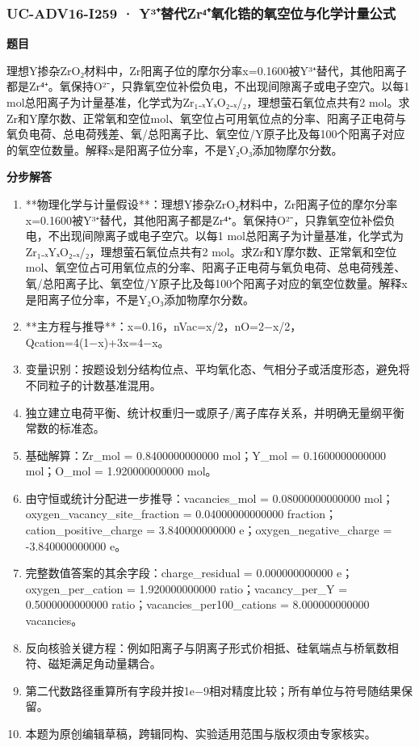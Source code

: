 \documentclass[UTF8,11pt,a4paper]{ctexart}
\begin{document}
\subsubsection*{UC-ADV16-I259 · Y³⁺替代Zr⁴⁺氧化锆的氧空位与化学计量公式}
\noindent\textbf{题目}\par
理想Y掺杂ZrO₂材料中，Zr阳离子位的摩尔分率x=0.1600被Y³⁺替代，其他阳离子都是Zr⁴⁺。氧保持O²⁻，只靠氧空位补偿负电，不出现间隙离子或电子空穴。以每1 mol总阳离子为计量基准，化学式为Zr₁₋ₓYₓO₂₋ₓ/₂，理想萤石氧位点共有2 mol。求Zr和Y摩尔数、正常氧和空位mol、氧空位占可用氧位点的分率、阳离子正电荷与氧负电荷、总电荷残差、氧/总阳离子比、氧空位/Y原子比及每100个阳离子对应的氧空位数量。解释x是阳离子位分率，不是Y₂O₃添加物摩尔分数。\par
\medskip\noindent\textbf{分步解答}
\begin{enumerate}
\item **物理化学与计量假设**：理想Y掺杂ZrO₂材料中，Zr阳离子位的摩尔分率x=0.1600被Y³⁺替代，其他阳离子都是Zr⁴⁺。氧保持O²⁻，只靠氧空位补偿负电，不出现间隙离子或电子空穴。以每1 mol总阳离子为计量基准，化学式为Zr₁₋ₓYₓO₂₋ₓ/₂，理想萤石氧位点共有2 mol。求Zr和Y摩尔数、正常氧和空位mol、氧空位占可用氧位点的分率、阳离子正电荷与氧负电荷、总电荷残差、氧/总阳离子比、氧空位/Y原子比及每100个阳离子对应的氧空位数量。解释x是阳离子位分率，不是Y₂O₃添加物摩尔分数。
\item **主方程与推导**：x=0.16，nVac=x/2，nO=2−x/2，Qcation=4(1−x)+3x=4−x。
\item 变量识别：按题设划分结构位点、平均氧化态、气相分子或活度形态，避免将不同粒子的计数基准混用。
\item 独立建立电荷平衡、统计权重归一或原子/离子库存关系，并明确无量纲平衡常数的标准态。
\item 基础解算：Zr\_mol = 0.8400000000000 mol；Y\_mol = 0.1600000000000 mol；O\_mol = 1.920000000000 mol。
\item 由守恒或统计分配进一步推导：vacancies\_mol = 0.08000000000000 mol；oxygen\_vacancy\_site\_fraction = 0.04000000000000 fraction；cation\_positive\_charge = 3.840000000000 e；oxygen\_negative\_charge = -3.840000000000 e。
\item 完整数值答案的其余字段：charge\_residual = 0.000000000000 e；oxygen\_per\_cation = 1.920000000000 ratio；vacancy\_per\_Y = 0.5000000000000 ratio；vacancies\_per100\_cations = 8.000000000000 vacancies。
\item 反向核验关键方程：例如阳离子与阴离子形式价相抵、硅氧端点与桥氧数相符、磁矩满足角动量耦合。
\item 第二代数路径重算所有字段并按1e−9相对精度比较；所有单位与符号随结果保留。
\item 本题为原创编辑草稿，跨辑同构、实验适用范围与版权须由专家核实。
\end{enumerate}
\end{document}

